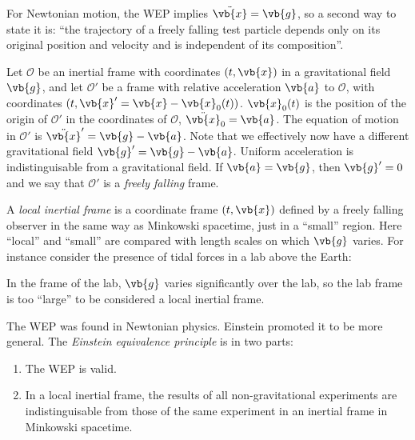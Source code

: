 \documentclass{jknotes}
\begin{document}
For Newtonian motion, the WEP implies \(\ddot{\vb{x}}=\vb{g}\), so a second way to state it is: ``the trajectory of a freely falling test particle depends only on its original position and velocity and is independent of its composition''. 

Let \(\mathcal{O}\) be an inertial frame with coordinates \((t,\vb{x})\) in a gravitational field \(\vb{g}\), and let \(\mathcal{O}'\) be a frame with relative acceleration \(\vb{a}\) to \(\mathcal{O}\), with coordinates \((t,\vb{x}'=\vb{x}-\vb{x}_0(t))\). \(\vb{x}_0(t)\) is the position of the origin of \(\mathcal{O}'\) in the coordinates of \(\mathcal{O}\), \(\ddot{\vb{x}}_0= \vb{a}\). The equation of motion in \(\mathcal{O}'\) is \(\ddot{\vb{x}}'=\vb{g}-\vb{a}\). Note that we effectively now have a different gravitational field \(\vb{g}' = \vb{g}-\vb{a}\). Uniform acceleration is indistinguisable from a gravitational field. If \(\vb{a}=\vb{g}\), then \(\vb{g}'=0\) and we say that \(\mathcal{O}'\) is a \emph{freely falling} frame.

A \emph{local inertial frame} is a coordinate frame \((t,\vb{x})\) defined by a freely falling observer in the same way as Minkowski spacetime, just in a ``small'' region. Here ``local'' and ``small'' are compared with length scales on which \(\vb{g}\) varies. For instance consider the presence of tidal forces in a lab above the Earth:
\begin{figure}[H]
    \centering
\end{figure}
In the frame of the lab, \(\vb{g}\) varies significantly over the lab, so the lab frame is too ``large'' to be considered a local inertial frame.

The WEP was found in Newtonian physics. Einstein promoted it to be more general. The \emph{Einstein equivalence principle} is in two parts:
\begin{enumerate}
    \item The WEP is valid.
    \item In a local inertial frame, the results of all non-gravitational experiments are indistinguisable from those of the same experiment in an inertial frame in Minkowski spacetime.
\end{enumerate}
\end{document}
